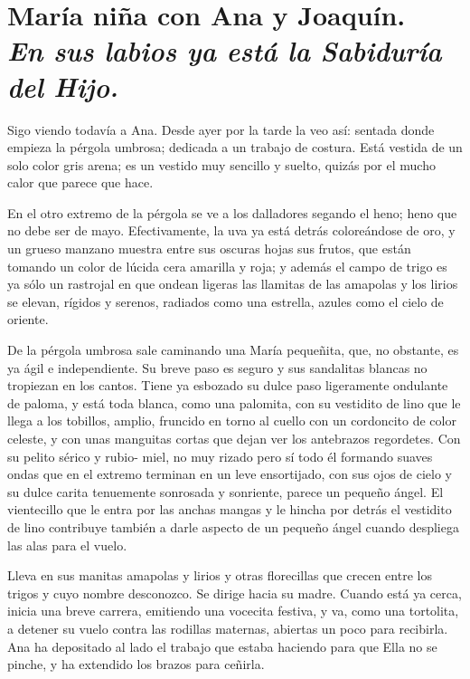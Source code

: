 \documentclass[12pt, twoside, openright]{book} %
\begin{document}
\chapter*{María niña con Ana y Joaquín. \\ \normalfont\normalsize\textit{En sus labios ya está la Sabiduría del Hijo.}}
 
Sigo viendo todavía a Ana. Desde ayer por la tarde la veo así: sentada donde empieza la pérgola umbrosa; dedicada a un trabajo de costura. Está vestida de un solo color gris arena; es un vestido muy sencillo y suelto, quizás por el mucho calor que parece que hace. 

En el otro extremo de la pérgola se ve a los dalladores segando el heno; heno que no debe ser de mayo. Efectivamente, la uva ya está detrás coloreándose de oro, y un grueso manzano muestra entre sus oscuras hojas sus frutos, que están tomando un color de lúcida cera amarilla y roja; y además el campo de trigo es ya sólo un rastrojal en que ondean ligeras las llamitas de las amapolas y los lirios se elevan, rígidos y serenos, radiados como una estrella, azules como el cielo de oriente. 

De la pérgola umbrosa sale caminando una María pequeñita, que, no obstante, es ya ágil e independiente. Su breve paso es seguro y sus sandalitas blancas no tropiezan en los cantos. Tiene ya esbozado su dulce paso ligeramente ondulante de paloma, y está toda blanca, como una palomita, con su vestidito de lino que le llega a los tobillos, amplio, fruncido en torno al cuello con un cordoncito de color celeste, y con unas manguitas cortas que dejan ver los antebrazos regordetes. Con su pelito sérico y rubio- miel, no muy rizado pero sí todo él formando suaves ondas que en el extremo terminan en un leve ensortijado, con sus ojos de cielo y su dulce carita tenuemente sonrosada y sonriente, parece un pequeño ángel. El vientecillo que le entra por las anchas mangas y le hincha por detrás el vestidito de lino contribuye también a darle aspecto de un pequeño ángel cuando despliega las alas para el vuelo. 

Lleva en sus manitas amapolas y lirios y otras florecillas que crecen entre los trigos y cuyo nombre desconozco. Se dirige hacia su madre. Cuando está ya cerca, inicia una breve carrera, emitiendo una vocecita festiva, y va, como una tortolita, a detener su vuelo contra las rodillas maternas, abiertas un poco para recibirla. Ana ha depositado al lado el trabajo que estaba haciendo para que Ella no se pinche, y ha extendido los brazos para ceñirla. 
\end{document}
